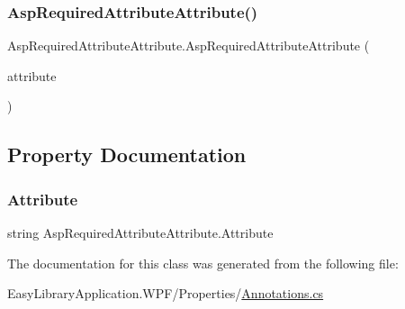 \subsubsection{\texorpdfstring{Asp\+Required\+Attribute\+Attribute()}{AspRequiredAttributeAttribute()}}
{\footnotesize\ttfamily Asp\+Required\+Attribute\+Attribute.\+Asp\+Required\+Attribute\+Attribute (\begin{DoxyParamCaption}\item[{\mbox{[}\+Not\+Null\mbox{]} string}]{attribute }\end{DoxyParamCaption})}



\subsection{Property Documentation}
\mbox{\label{class_asp_required_attribute_attribute_a8d782b24a958ba36ee4d63265a5db96d}} 
\subsubsection{\texorpdfstring{Attribute}{Attribute}}
{\footnotesize\ttfamily string Asp\+Required\+Attribute\+Attribute.\+Attribute\hspace{0.3cm}{\ttfamily [get]}}



The documentation for this class was generated from the following file\+:\begin{DoxyCompactItemize}
\item 
Easy\+Library\+Application.\+W\+P\+F/\+Properties/\mbox{\hyperlink{_annotations_8cs}{Annotations.\+cs}}\end{DoxyCompactItemize}
